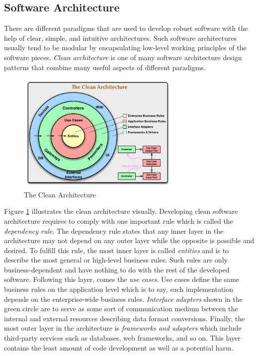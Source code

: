 \subsection{Software Architecture}

There are different paradigms that are used to develop robust software with the help of clear, 
simple, and intuitive architectures. Such software architectures usually tend to be modular by 
encapsulating low-level working principles of the software pieces. \textit{Clean architecture} is 
one of many software architecture design patterns that combine many useful aspects of different 
paradigms.

\begin{figure}[H]
	\centering
	\includegraphics[width=0.7\textwidth]{../../resources/CleanArchitecture.jpeg}
	\caption{The Clean Architecture \cite{unclebob}}
	\label{fig:clean_arch}
\end{figure}

Figure \ref{fig:clean_arch} illustrates the clean architecture visually. Developing clean software 
architecture requires to comply with one important rule which is called the 
\textit{dependency rule}. The dependency rule states that any inner layer in the architecture may not 
depend on any outer layer while the opposite is possible and desired. To fulfill this rule, the most 
inner layer is called \textit{entities} and is to describe the most general or high-level business 
rules. Such rules are only business-dependent and have nothing to do with the rest of the developed 
software. Following this layer, comes the \textit{use cases}. Use cases define the same business rules 
on the application level which is to say, such implementation depends on the enterprise-wide business 
rules. \textit{Interface adapters} shown in the green circle are to serve as some sort of communication 
medium between the internal and external resources describing data format conversions. Finally, the 
most outer layer in the architecture is \textit{frameworks and adapters} which include third-party 
services such as databases, web frameworks, and so on. This layer contains the least amount of code 
development as well as a potential harm.

